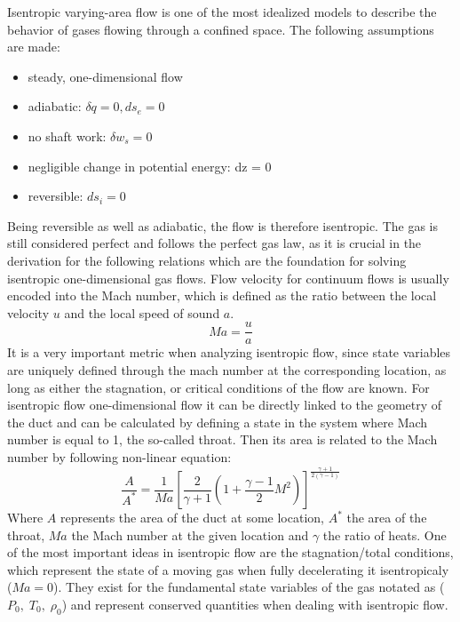 	Isentropic varying-area flow is one of the most idealized models to describe the behavior of gases flowing through a confined space. The following assumptions are made:
	\begin{itemize}
		\item steady, one-dimensional flow
		\item adiabatic: $\delta q = 0, ds_e = 0$
		\item no shaft work: $\delta w_s = 0$
		\item negligible change in potential energy: dz = 0
		\item reversible: $ds_i = 0$
	\end{itemize}
	Being reversible as well as adiabatic, the flow is therefore isentropic.
	The gas is still considered perfect and follows the perfect gas law, as it is crucial in the derivation for the following relations which are the foundation for solving isentropic one-dimensional gas flows.
	Flow velocity for continuum flows is usually encoded into the Mach number, which is defined as the ratio between the local velocity $u$ and the local speed of sound $a$.
	\begin{equation}
		Ma = \frac{u}{a}
	\end{equation}
	It is a very important metric when analyzing isentropic flow, since state variables are uniquely defined through the mach number at the corresponding location, as long as either the stagnation, or critical conditions of the flow are known.
	For isentropic flow one-dimensional flow it can be directly linked to the geometry of the duct and can be calculated by defining a state in the system where Mach number is equal to 1, the so-called throat.
	Then its area is related to the Mach number by following non-linear equation:
	\begin{equation}
		\frac{A}{A^*} = \frac{1}{Ma} \left[ \frac{2}{\gamma + 1} \left( 1 + \frac{\gamma - 1}{2} M^2 \right) \right]^{\frac{\gamma + 1}{2(\gamma - 1)}}
	\end{equation}\label{eq:area_ratio_mach}
	Where $A$ represents the area of the duct at some location, $A^*$ the area of the throat, $Ma$ the Mach number at the given location and $\gamma$ the ratio of heats.
	One of the most important ideas in isentropic flow are the stagnation/total conditions, which represent the state of a moving gas when fully decelerating it isentropicaly ($Ma = 0$).
	They exist for the fundamental state variables of the gas notated as ($P_0,\;T_0,\;\rho_0$) and represent conserved quantities when dealing with isentropic flow.
